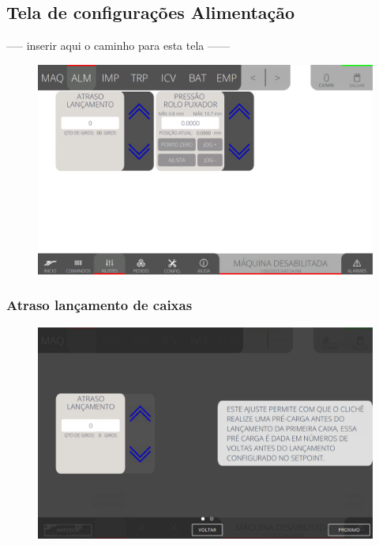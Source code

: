\thispagestyle{fancy}
\vspace*{40 pt}
\subsection{Tela de configurações Alimentação} \label{sec:telaConfiguracoesAlimentacao}
----- inserir aqui o caminho para esta tela ------
\vspace*{\fill}
\begin{figure}[h]
    \centering
    \includegraphics[width=480 px,height=300 px]{src/imagesICV/03-feeder/settings/1.png}
\end{figure}
\vspace*{\fill}

\newpage
\thispagestyle{fancy}
\vspace*{40 pt}
\subsubsection{\small{Atraso lançamento de caixas}} \label{sec:telaConfiguracoesAlimentacaoAtrasoLancamentoDeCaixas}
\vspace*{\fill}
\begin{figure}[h]
    \centering
    \includegraphics[width=576 px,height=360 px]{src/imagesICV/03-feeder/settings/2.png}
\end{figure}
\vspace*{\fill}


